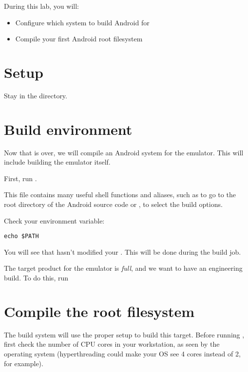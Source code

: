 
During this lab, you will:
\begin{itemize}
  \item Configure which system to build Android for
  \item Compile your first Android root filesystem
\end{itemize}

\section{Setup}

Stay in the  directory.

\section{Build environment}

Now that  is over, we will compile an Android system
for the emulator. This will include building the emulator itself.

First, run .

This file contains many useful shell functions and aliases, such as
 to go to the root directory of the Android source code or
, to select the build options.

Check your  environment variable:

\begin{verbatim}
echo $PATH
\end{verbatim}

You will see that  hasn't modified your
.  This will be done during the build job.

The target product for the emulator is {\it full}, and we want to
have an engineering build. To do this, run 

\section{Compile the root filesystem}

The build system will use the proper setup to build this
target. Before running , first check the number of CPU
cores in your workstation, as seen by the operating system
(hyperthreading could make your OS see 4 cores instead of 2, for
example).

